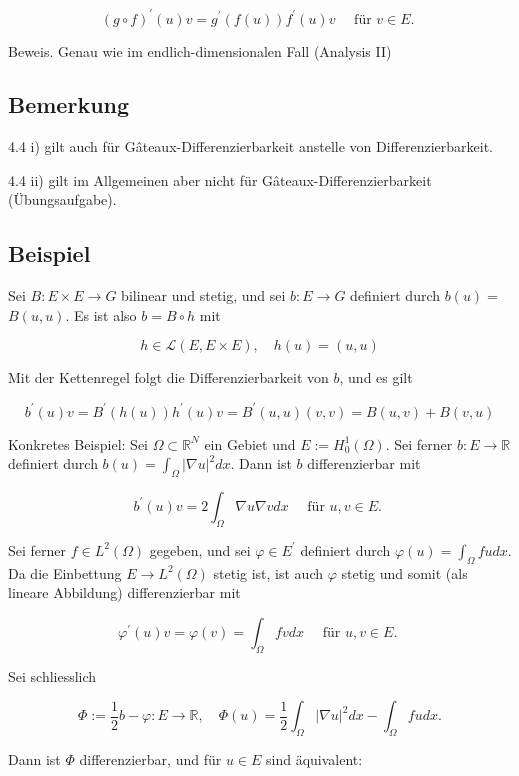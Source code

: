 \documentclass[10pt, letterpaper]{article}
\begin{document}
$$
(g \circ f)^{\prime}(u) v=g^{\prime}(f(u)) f^{\prime}(u) v \quad \text { für } v \in E \text {. }
$$

Beweis. Genau wie im endlich-dimensionalen Fall (Analysis II)

\subsection*{Bemerkung}

4.4 i) gilt auch für Gâteaux-Differenzierbarkeit anstelle von Differenzierbarkeit.

4.4 ii) gilt im Allgemeinen aber nicht für Gâteaux-Differenzierbarkeit (Übungsaufgabe).

\subsection*{Beispiel}

Sei $B: E \times E \rightarrow G$ bilinear und stetig, und sei $b: E \rightarrow G$ definiert durch $b(u)=$ $B(u, u)$. Es ist also $b=B \circ h$ mit

$$
h \in \mathcal{L}(E, E \times E), \quad h(u)=(u, u)
$$

Mit der Kettenregel folgt die Differenzierbarkeit von $b$, und es gilt

$$
b^{\prime}(u) v=B^{\prime}(h(u)) h^{\prime}(u) v=B^{\prime}(u, u)(v, v)=B(u, v)+B(v, u)
$$

Konkretes Beispiel: Sei $\Omega \subset \mathbb{R}^{N}$ ein Gebiet und $E:=H_{0}^{1}(\Omega)$. Sei ferner $b: E \rightarrow \mathbb{R}$ definiert durch $b(u)=\int_{\Omega}|\nabla u|^{2} d x$. Dann ist $b$ differenzierbar mit

$$
b^{\prime}(u) v=2 \int_{\Omega} \nabla u \nabla v d x \quad \text { für } u, v \in E \text {. }
$$

Sei ferner $f \in L^{2}(\Omega)$ gegeben, und sei $\varphi \in E^{\prime}$ definiert durch $\varphi(u)=\int_{\Omega} f u d x$. Da die Einbettung $E \rightarrow L^{2}(\Omega)$ stetig ist, ist auch $\varphi$ stetig und somit (als lineare Abbildung) differenzierbar mit

$$
\varphi^{\prime}(u) v=\varphi(v)=\int_{\Omega} f v d x \quad \text { für } u, v \in E \text {. }
$$

Sei schliesslich

$$
\Phi:=\frac{1}{2} b-\varphi: E \rightarrow \mathbb{R}, \quad \Phi(u)=\frac{1}{2} \int_{\Omega}|\nabla u|^{2} d x-\int_{\Omega} f u d x .
$$

Dann ist $\Phi$ differenzierbar, und für $u \in E$ sind äquivalent:
\end{document}
